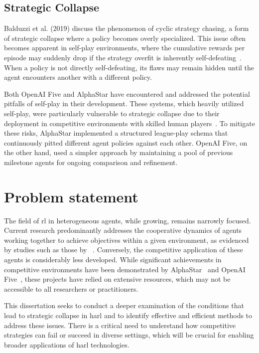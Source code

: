     \subsection*{Strategic Collapse}%

Balduzzi et al. (2019) discuss the phenomenon of cyclic strategy chasing, 
a form of strategic collapse where a policy becomes overly specialized. 
This issue often becomes apparent in self-play environments, 
where the cumulative rewards per episode may suddenly drop if the strategy overfit is 
inherently self-defeating~\cite{balduzzi2019}. 
When a policy is not directly self-defeating, its flaws may remain hidden until the 
agent encounters another with a different policy.

Both OpenAI Five and AlphaStar have encountered and addressed the potential pitfalls of 
self-play in their development. These systems, which heavily utilized self-play, 
were particularly vulnerable to strategic collapse due to their deployment in competitive 
environments with skilled human players~\cite{berner2019, vinyals2019}. 
To mitigate these risks, AlphaStar implemented a structured league-play schema that 
continuously pitted different agent policies against each other. 
OpenAI Five, on the other hand, used a simpler approach by maintaining a pool of 
previous milestone agents for ongoing comparison and refinement.


\section{Problem statement}%
\label{sec:problem_statement}

The field of \gls*{rl} in heterogeneous agents, while growing, remains narrowly focused. 
Current research predominantly addresses the cooperative dynamics of agents working together to 
achieve objectives within a given environment, as evidenced by studies such as those by 
~\cite*{zhong2024, zheng2020, wakilpoor2020, kapetanakis2005}. 
Conversely, the competitive application of these agents is considerably less developed. 
While significant achievements in competitive environments have been demonstrated by 
AlphaStar~\cite{vinyals2019} and OpenAI Five~\cite{berner2019}, 
these projects have relied on extensive resources, which may not be accessible to all 
researchers or practitioners.

This dissertation seeks to conduct a deeper examination of the conditions that lead to strategic
collapse in \gls*{harl} and to identify effective and efficient methods to address these issues. 
There is a critical need to understand how competitive strategies can fail or succeed in diverse 
settings, which will be crucial for enabling broader applications of \gls*{harl} technologies.

